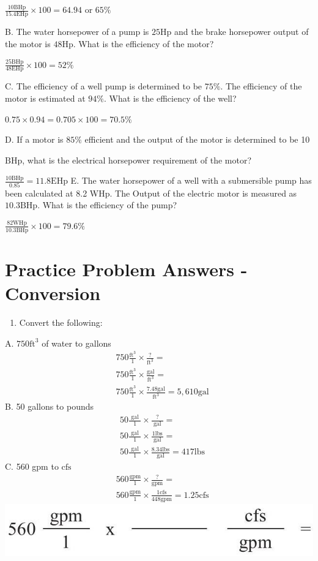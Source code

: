 \documentclass[10pt]{article}
\begin{document}
$\frac{10 \mathrm{BHp}}{15.4 \mathrm{EHp}} \times 100=64.94$ or $65 \%$

B. The water horsepower of a pump is $25 \mathrm{Hp}$ and the brake horsepower output of the motor is $48 \mathrm{Hp}$. What is the efficiency of the motor?

$\frac{25 \mathrm{BHp}}{48 \mathrm{EHp}} \times 100=52 \%$

C. The efficiency of a well pump is determined to be $75 \%$. The efficiency of the motor is estimated at $94 \%$. What is the efficiency of the well?

$0.75 \times 0.94=0.705 \times 100=70.5 \%$

D. If a motor is $85 \%$ efficient and the output of the motor is determined to be 10

$\mathrm{BHp}$, what is the electrical horsepower requirement of the motor?

$\frac{10 \mathrm{BHp}}{0.85}=11.8 \mathrm{EHp}$ E. The water horsepower of a well with a submersible pump has been calculated at 8.2 WHp. The Output of the electric motor is measured as $10.3 \mathrm{BHp}$. What is the efficiency of the pump?

$\frac{82 \mathrm{WHp}}{10.3 \mathrm{BHp}} \times 100=79.6 \%$

\section{Practice Problem Answers - Conversion}
\begin{enumerate}
  \item Convert the following:
\end{enumerate}
A. $750 \mathrm{ft}^{3}$ of water to gallons
$$
\begin{aligned}
&750 \frac{\mathrm{ft}^{3}}{1} \times \frac{?}{\mathrm{ft}^{3}}= \\
&750 \frac{\mathrm{ft}^{3}}{1} \times \frac{\mathrm{gal}}{\mathrm{ft}^{3}}= \\
&750 \frac{\mathrm{ft}^{3}}{1} \times \frac{7.48 \mathrm{gal}}{\mathrm{ft}^{3}}=5,610 \mathrm{gal}
\end{aligned}
$$
B. 50 gallons to pounds
$$
\begin{aligned}
&50 \frac{\text { gal }}{1} \times \frac{?}{\text { gal }}= \\
&50 \frac{\text { gal }}{1} \times \frac{1 \mathrm{lbs}}{\text { gal }}= \\
&50 \frac{\text { gal }}{1} \times \frac{8.34 \mathrm{lbs}}{\text { gal }}=417 \mathrm{lbs}
\end{aligned}
$$
C. 560 gpm to $\mathrm{cfs}$
$$
\begin{aligned}
& 560 \frac{\mathrm{gpm}}{1} \times \frac{?}{\mathrm{gpm}}= \\
& 560 \frac{\mathrm{gpm}}{1} \times \frac{1 \mathrm{cfs}}{448 \mathrm{gpm}}=1.25 \mathrm{cfs}
\end{aligned}
$$
\includegraphics[max width=\textwidth]{2022_09_11_72dbedc910e6e984560cg-67}
\end{document}
